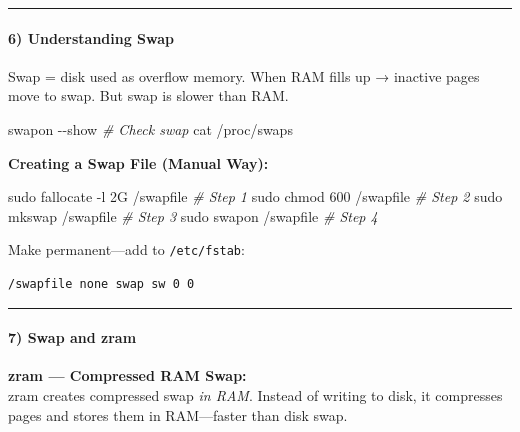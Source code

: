 \documentclass[
  english,
  paper=a4,
  oneside  ,captions=tableheading
]{scrartcl}
\newenvironment{Shaded}{}{}
\newcommand{\AttributeTok}[1]{\textcolor[rgb]{0.49,0.56,0.16}{#1}}
\newcommand{\CommentTok}[1]{\textcolor[rgb]{0.38,0.63,0.69}{\textit{#1}}}
\newcommand{\ExtensionTok}[1]{#1}
\newcommand{\FunctionTok}[1]{\textcolor[rgb]{0.02,0.16,0.49}{#1}}
\newcommand{\NormalTok}[1]{#1}
\newcounter{none} %
\begin{document}
\begin{center}\rule{0.5\linewidth}{0.5pt}\end{center}

\paragraph{6) Understanding Swap}\label{understanding-swap}

Swap = disk used as overflow memory. When RAM fills up → inactive pages
move to swap. But swap is slower than RAM.

\begin{Shaded}
\begin{Highlighting}[]
\ExtensionTok{swapon} \AttributeTok{{-}{-}show}         \CommentTok{\# Check swap}
\FunctionTok{cat}\NormalTok{ /proc/swaps}
\end{Highlighting}
\end{Shaded}

\textbf{Creating a Swap File (Manual Way):}

\begin{Shaded}
\begin{Highlighting}[]
\FunctionTok{sudo}\NormalTok{ fallocate }\AttributeTok{{-}l}\NormalTok{ 2G /swapfile    }\CommentTok{\# Step 1}
\FunctionTok{sudo}\NormalTok{ chmod 600 /swapfile          }\CommentTok{\# Step 2}
\FunctionTok{sudo}\NormalTok{ mkswap /swapfile             }\CommentTok{\# Step 3}
\FunctionTok{sudo}\NormalTok{ swapon /swapfile             }\CommentTok{\# Step 4}
\end{Highlighting}
\end{Shaded}

Make permanent---add to \texttt{/etc/fstab}:

\begin{verbatim}
/swapfile none swap sw 0 0
\end{verbatim}

\begin{center}\rule{0.5\linewidth}{0.5pt}\end{center}

\paragraph{7) Swap and zram}\label{swap-and-zram}

\textbf{zram --- Compressed RAM Swap:}\\
zram creates compressed swap \emph{in RAM}. Instead of writing to disk,
it compresses pages and stores them in RAM---faster than disk swap.
\end{document}
